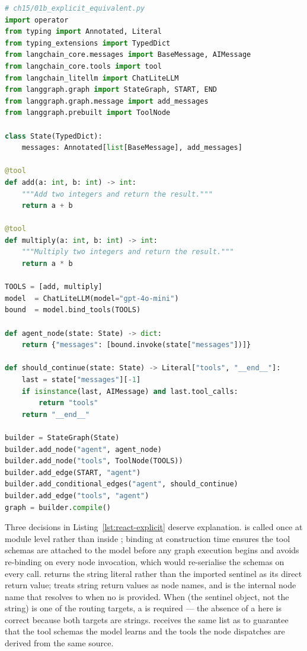 \begin{lstlisting}[language=Python,
  caption={Hand-rolled two-node equivalent of the prebuilt loop},
  label={lst:react-explicit}]
# ch15/01b_explicit_equivalent.py
import operator
from typing import Annotated, Literal
from typing_extensions import TypedDict
from langchain_core.messages import BaseMessage, AIMessage
from langchain_core.tools import tool
from langchain_litellm import ChatLiteLLM
from langgraph.graph import StateGraph, START, END
from langgraph.graph.message import add_messages
from langgraph.prebuilt import ToolNode

class State(TypedDict):
    messages: Annotated[list[BaseMessage], add_messages]

@tool
def add(a: int, b: int) -> int:
    """Add two integers and return the result."""
    return a + b

@tool
def multiply(a: int, b: int) -> int:
    """Multiply two integers and return the result."""
    return a * b

TOOLS = [add, multiply]
model  = ChatLiteLLM(model="gpt-4o-mini")
bound  = model.bind_tools(TOOLS)

def agent_node(state: State) -> dict:
    return {"messages": [bound.invoke(state["messages"])]}

def should_continue(state: State) -> Literal["tools", "__end__"]:
    last = state["messages"][-1]
    if isinstance(last, AIMessage) and last.tool_calls:
        return "tools"
    return "__end__"

builder = StateGraph(State)
builder.add_node("agent", agent_node)
builder.add_node("tools", ToolNode(TOOLS))
builder.add_edge(START, "agent")
builder.add_conditional_edges("agent", should_continue)
builder.add_edge("tools", "agent")
graph = builder.compile()
\end{lstlisting}

Three decisions in Listing~\ref{lst:react-explicit} deserve explanation.
 is called once at module level rather than
inside ; binding at construction time ensures the tool
schemas are attached to the model before any graph execution begins and
avoids re-binding on every node invocation, which would re-serialise the
schemas on every call.  returns the string literal
 rather than the imported  sentinel as its
direct return value;  treats string return
values as node names, and  is the internal node name
that  resolves to when no  is provided. When
 (the sentinel object, not the string) is one of the routing
targets, a  is required --- the absence of a 
here is correct because both targets are strings. 
receives the same list as  to guarantee that the tool
schemas the model learns and the tools the node dispatches are derived from
the same source.

